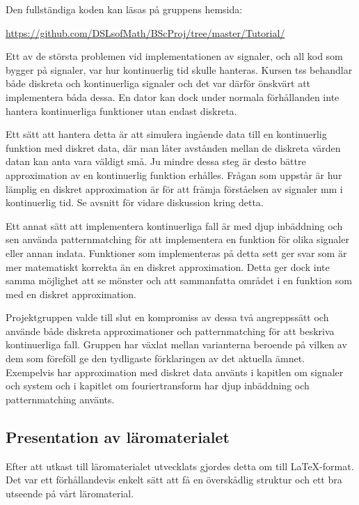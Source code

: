 \documentclass[12pt,a4paper,twoside,openright]{article}
\begin{document}
Den fullständiga koden kan läsas på gruppens hemsida:

\url{https://github.com/DSLsofMath/BScProj/tree/master/Tutorial/}

Ett av de största problemen vid implementationen av signaler, och all
kod som bygger på signaler, var hur kontinuerlig tid skulle
hanteras. Kursen \gls{tss} behandlar både diskreta och kontinuerliga
signaler och det var därför önskvärt att implementera båda dessa. En
dator kan dock under normala förhållanden inte hantera kontinuerliga
funktioner utan endast diskreta.

Ett sätt att hantera detta är att simulera ingående data till en
kontinuerlig funktion med diskret data, där man låter avstånden mellan
de diskreta värden datan kan anta vara väldigt små. Ju mindre dessa
steg är desto bättre approximation av en kontinuerlig funktion
erhålles. Frågan som uppstår är hur lämplig en diskret approximation
är för att främja förståelsen av signaler mm i kontinuerlig tid. Se
avsnitt  för vidare diskussion kring detta.

Ett annat sätt att implementera kontinuerliga fall är med djup
inbäddning och sen använda \gls{patternmatching} för att implementera
en funktion för olika signaler eller annan indata. Funktioner som
implementeras på detta sett ger svar som är mer matematiskt korrekta
än en diskret approximation. Detta ger dock inte samma möjlighet att
se mönster och att sammanfatta området i en funktion som med en
diskret approximation.

Projektgruppen valde till slut en kompromiss av dessa två angreppssätt
och använde både diskreta approximationer och \gls{patternmatching}
för att beskriva kontinuerliga fall. Gruppen har växlat mellan
varianterna beroende på vilken av dem som föreföll ge den tydligaste
förklaringen av det aktuella ämnet. Exempelvis har approximation med
diskret data använts i kapitlen om signaler och system och i kapitlet
om fouriertransform har djup inbäddning och \gls{patternmatching} använts.

\subsection{Presentation av läromaterialet}
Efter att utkast till läromaterialet utvecklats gjordes detta om till
LaTeX-format. Det var ett förhållandevis enkelt sätt att få en överskådlig
struktur och ett bra utseende på vårt läromaterial.
\end{document}
